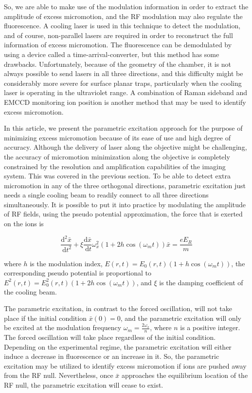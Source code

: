 So, we are able to make use of the modulation information in order to extract the amplitude of excess micromotion, and the RF modulation may also regulate the fluorescence. A cooling laser is used in this technique to detect the modulation, and of course, non-parallel lasers are required in order to reconstruct the full information of excess micromotion. The fluorescence can be demodulated by using a device called a time-arrival-converter, but this method has some drawbacks. Unfortunately, because of the geometry of the chamber, it is not always possible to send lasers in all three directions, and this difficulty might be considerably more severe for surface planar traps, particularly when the cooling laser is operating in the ultraviolet range. A combination of Raman sideband and EMCCD monitoring ion position is another method that may be used to identify excess micromotion.

In this article, we present the parametric excitation approach for the purpose of minimizing excess micromotion because of its ease of use and high degree of accuracy. Although the delivery of laser along the objective might be challenging, the accuracy of micromotion minimization along the objective is completely constrained by the resolution and amplification capabilities of the imaging system. This was covered in the previous section. To be able to detect extra micromotion in any of the three orthogonal directions, parametric excitation just needs a single cooling beam to readily connect to all three directions simultaneously. It is possible to put it into practice by modulating the amplitude of RF fields, using the pseudo potential approximation, the force that is exerted on the ions is

\begin{equation}
    \frac{\mathrm{d}^2 \bar{x}}{\mathrm{~d} t^2}+\xi \frac{\mathrm{d} \bar{x}}{\mathrm{~d} t} \omega_x^2\left(1+2 h \cos \left(\omega_m t\right)\right) \bar{x}=\frac{e E_R}{m}
\end{equation}

where \(h\) is the modulation index, \(E(r,t)=E_0(r,t)(1+h\cos(\omega_m t))\), the corresponding pseudo potential is proportional to \(E^2(r,t)=E_0^2(r,t)(1+2h\cos(\omega_m t))\), and \(\xi\) is the damping coefficient of the cooling beam.

The parametric excitation, in contrast to the forced oscillation, will not take place if the initial condition \(\bar{x}(0)=0\), and the parametric excitation will only be excited at the modulation frequency \(\omega_m=\frac{2\omega_x}{n}\), where \(n\) is a positive integer. The forced oscillation will take place regardless of the initial condition. Depending on the experimental regime, the parametric excitation will either induce a decrease in fluorescence or an increase in it. So, the parametric excitation may be utilized to identify excess micromotion if ions are pushed away from the RF null. Nevertheless, once \(\bar{x}\) approaches the equilibrium location of the RF null, the parametric excitation will cease to exist.

